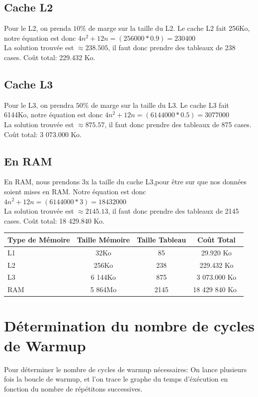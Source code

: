 \documentclass[a4paper]{report}
\begin{document}
\subsection*{Cache L2}
Pour le L2, on prenda $10\%$ de marge sur la taille du L2.
Le cache L2 fait 256Ko, notre équation est donc $4n^2+12n=(256 000*0.9)=230 400$\\
La solution trouvée est $\approx 238.505$, il faut donc prendre des tableaux de 238 cases. Coût total: 229.432 Ko.\\

\subsection*{Cache L3}
Pour le L3, on prendra $50\%$ de marge sur la taille du L3.
Le cache L3 fait 6144Ko, notre équation est donc $4n^2+12n=(6 144 000*0.5)= 3 077 000$\\
La solution trouvée est $\approx 875.57$, il faut donc prendre des tableaux de 875 cases. Coût total: 3 073.000 Ko.\\

\subsection*{En RAM}
En RAM, nous prendons 3x la taille du cache L3,pour être sur que nos données soient mises en RAM.
Notre équation est donc $4n^2+12n=(6 144 000*3)=18 432 000$\\
La solution trouvée est $\approx 2145.13$, il faut donc prendre des tableaux de 2145 cases. Coût total: 18 429.840 Ko.\\

\begin{tabular}{ l c | c c }
    Type de Mémoire & Taille Mémoire & Taille Tableau & Coût Total\\\hline
    L1 & 32Ko & 85 & 29.920 Ko\\ 
    L2 & 256Ko & 238 & 229.432 Ko \\
    L3 & 6 144Ko & 875 & 3 073.000 Ko \\
    RAM & 5 864Mo & 2145 & 18 429 840 Ko \\
\end{tabular}

\section*{Détermination du nombre de cycles de Warmup}

Pour déterminer le nombre de cycles de warmup nécessaires: On lance plusieurs fois la boucle de warmup, et l'on trace le graphe du temps d'éxécution en fonction du nombre de répétitons successives.
\end{document}
